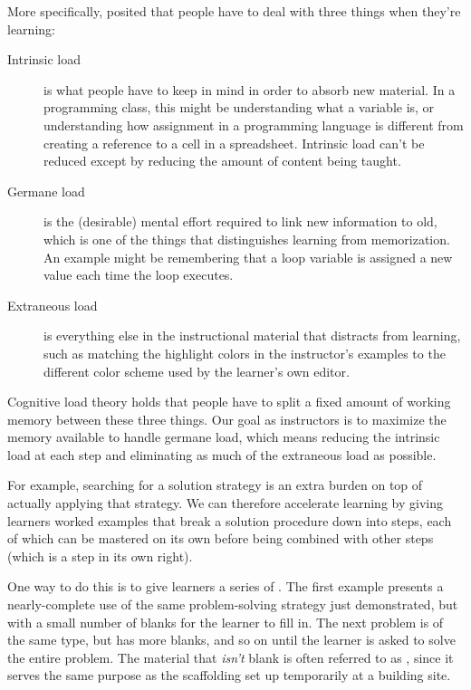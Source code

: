 More specifically,  posited that people have to deal with three things when
they're learning:

\begin{description}

  \item[Intrinsic load] is what people have to keep in mind in order
    to absorb new material.  In a programming class, this might be
    understanding what a variable is, or understanding how assignment
    in a programming language is different from creating a reference
    to a cell in a spreadsheet.  Intrinsic load can't be reduced
    except by reducing the amount of content being taught.

  \item[Germane load] is the (desirable) mental effort required to
    link new information to old, which is one of the things that
    distinguishes learning from memorization. An example might be
    remembering that a loop variable is assigned a new value each time
    the loop executes.

  \item[Extraneous load] is everything else in the instructional
    material that distracts from learning, such as matching the
    highlight colors in the instructor's examples to the different
    color scheme used by the learner's own editor.

\end{description}

Cognitive load theory holds that people have to split a fixed amount
of working memory between these three things.  Our goal as instructors
is to maximize the memory available to handle germane load, which
means reducing the intrinsic load at each step and eliminating as much
of the extraneous load as possible.

For example, searching for a solution strategy is an extra burden on
top of actually applying that strategy.  We can therefore accelerate
learning by giving learners worked examples that break a solution
procedure down into steps, each of which can be mastered on its own
before being combined with other steps (which is a step in its own
right).

One way to do this is to give learners a series of
.  The first example
presents a nearly-complete use of the same problem-solving strategy
just demonstrated, but with a small number of blanks for the learner
to fill in. The next problem is of the same type, but has more blanks,
and so on until the learner is asked to solve the entire problem. The
material that \emph{isn't} blank is often referred to as
, since it serves the same
purpose as the scaffolding set up temporarily at a building site.

